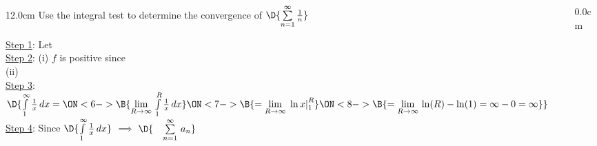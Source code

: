 \begin{frame}
\frametitle{}
\scriptsize
\begin{columns}
\begin{column}{12.0cm}
	Use the integral test to determine the convergence of \quad $\D{\sum \limits_{n=1}^{\infty} \frac{1}{n}}$
	
%

\vspace{0.2cm}

\underline{Step 1}: \quad Let 
	\ON<2->{\B{$f(x) = \frac{1}{x}$ on $[1,\infty)$}}\\
\vspace{0.5cm}
\underline{Step 2}: \quad (i) $f$ is positive since 
	\ON<3->{\B{$x$ is positive on $[1,\infty)$}}\\
\vspace{0.2cm}
\hspace{0.9cm}\quad (ii) \\
\vspace{0.5cm}
\underline{Step 3}: \quad $\D{\int \limits_{1}^{\infty} \frac{1}{x} \, dx = 
	\ON<6->{\B{\lim \limits_{R \to \infty}\, \int \limits_{1}^{R} \frac{1}{x} \, dx}} 
	\ON<7->{\B{= \lim \limits_{R \to \infty}\, \left. \ln x \right|_1^R}} 
	\ON<8->{\B{= \lim \limits_{R \to \infty}\, \ln(R) - \ln(1) = \infty - 0 = \infty}}}$\\
\vspace{0.5cm}
\underline{Step 4}: \quad Since \quad $\D{\int \limits_{1}^{\infty} \frac{1}{x} \, dx}$ 
	 $\implies$ $\D{\quad \sum \limits_{n=1}^{\infty}\, a_n}$ 
	\ON<10->{\B{\quad diverges}}

\vspace{2.2cm}
\end{column}
\begin{column}{0.0cm}\end{column}
\end{columns}
\end{frame}

